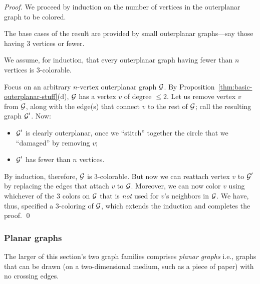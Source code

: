 \begin{proof}
We proceed by induction on the number of vertices in the outerplanar
graph to be colored.

The base cases of the result are provided by small outerplanar
graphs---say those having $3$ vertices or fewer.

We assume, for induction, that every outerplanar graph having fewer
than $n$ vertices is $3$-colorable.

Focus on an arbitrary $n$-vertex outerplanar graph $\mbox{$\cal G$}$.  By
Proposition~\ref{thm:basic-outerplanar-stuff}(d), $\mbox{$\cal G$}$ has a vertex $v$
of degree $\leq 2$.  Let us remove vertex $v$ from $\mbox{$\cal G$}$, along with the
edge(s) that connect $v$ to the rest of $\mbox{$\cal G$}$; call the resulting graph
$\mbox{$\cal G$}'$.  Now: 
\begin{itemize}
\item
$\mbox{$\cal G$}'$ is clearly outerplanar, once we ``stitch'' together the circle that we ``damaged'' 
by removing $v$;
\item
$\mbox{$\cal G$}'$ has fewer than $n$ vertices.
\end{itemize}
By induction, therefore, $\mbox{$\cal G$}$ is $3$-colorable.  But now we can reattach vertex $v$ to $\mbox{$\cal G$}'$
by replacing the edges that attach $v$ to $\mbox{$\cal G$}$.  Moreover, we can now color $v$ using
whichever of the $3$ colors on $\mbox{$\cal G$}$ that is {\em not} used for $v$'s neighbors in $\mbox{$\cal G$}$.
We have, thus, specified a $3$-coloring of $\mbox{$\cal G$}$, which extends the
induction and completes the proof.  \qed
\end{proof}



\subsubsection{Planar graphs}
\label{sec:planar-graphs}

  
The larger of this section's two graph families comprises {\it planar graphs} i.e., graphs
that can be drawn (on a two-dimensional medium, such as a piece of
paper) with no crossing edges.


